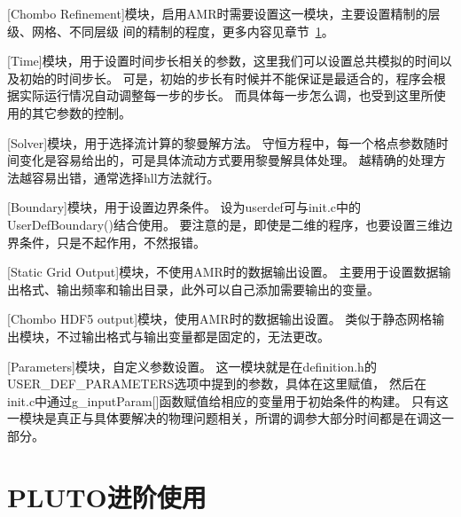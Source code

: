 [Chombo Refinement]模块，启用AMR时需要设置这一模块，主要设置精制的层级、网格、不同层级
间的精制的程度，更多内容见章节~\ref{PLUTOmore}。

[Time]模块，用于设置时间步长相关的参数，这里我们可以设置总共模拟的时间以及初始的时间步长。
可是，初始的步长有时候并不能保证是最适合的，程序会根据实际运行情况自动调整每一步的步长。
而具体每一步怎么调，也受到这里所使用的其它参数的控制。

[Solver]模块，用于选择流计算的黎曼解方法。
守恒方程中，每一个格点参数随时间变化是容易给出的，可是具体流动方式要用黎曼解具体处理。
越精确的处理方法越容易出错，通常选择hll方法就行。

[Boundary]模块，用于设置边界条件。
设为userdef可与init.c中的UserDefBoundary()结合使用。
要注意的是，即使是二维的程序，也要设置三维边界条件，只是不起作用，不然报错。

[Static Grid Output]模块，不使用AMR时的数据输出设置。
主要用于设置数据输出格式、输出频率和输出目录，此外可以自己添加需要输出的变量。

[Chombo HDF5 output]模块，使用AMR时的数据输出设置。
类似于静态网格输出模块，不过输出格式与输出变量都是固定的，无法更改。

[Parameters]模块，自定义参数设置。
这一模块就是在definition.h的USER\_DEF\_PARAMETERS选项中提到的参数，具体在这里赋值，
然后在init.c中通过g\_inputParam[]函数赋值给相应的变量用于初始条件的构建。
只有这一模块是真正与具体要解决的物理问题相关，所谓的调参大部分时间都是在调这一部分。

\section{PLUTO进阶使用}
\label{PLUTOmore}

